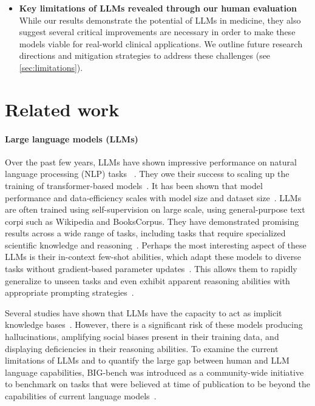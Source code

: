 \begin{itemize}[leftmargin=1.5em,rightmargin=0em]
\item \textbf{Key limitations of LLMs revealed through our human evaluation} While our results demonstrate the potential of LLMs in medicine, they also suggest several critical improvements are necessary in order to make these models viable for real-world clinical applications. We outline future research directions and mitigation strategies to address these challenges (see \ref{sec:limitations}).

\end{itemize}

\section{Related work}
\label{sec:related_work}
\paragraph{Large language models (LLMs)} Over the past few years, LLMs have shown impressive performance on natural language processing (NLP) tasks ~\cite{brown2020language, chowdhery2022palm, chung2022scaling, hoffmann2022training, scao2022bloom, rae2021scaling, raffel2020exploring, wei2021finetuned, wei2022chain, zhang2022opt}. They owe their success to scaling up the training of transformer-based models~\cite{vaswani2017attention}. It has been shown that model performance and data-efficiency scales with model size and dataset size~\cite{kaplan2020scaling}. LLMs are often trained using self-supervision on large scale, using general-purpose text corpi such as Wikipedia and BooksCorpus. They have demonstrated promising results across a wide range of tasks, including tasks that require specialized scientific knowledge and reasoning~\cite{hendrycks2020measuring, cobbe2021training}. Perhaps the most interesting aspect of these LLMs is their in-context few-shot abilities, which adapt these models to diverse tasks without gradient-based parameter updates~\cite{brown2020language, lampinen2022can, kojima2022large, wei2021finetuned}. This allows them to rapidly generalize to unseen tasks and even exhibit apparent reasoning abilities with appropriate prompting strategies~\cite{chowdhery2022palm, lewkowycz2022solving, taylor2022galactica, wei2022chain}.  

Several studies have shown that LLMs have the capacity to act as implicit knowledge bases~\cite{joshi2017triviaqa, hendrycks2020measuring, taylor2022galactica}. However, there is a significant risk of these models producing hallucinations, amplifying social biases present in their training data, and displaying deficiencies in their reasoning abilities. To examine the current limitations of LLMs and to quantify the large gap between human and LLM language capabilities, BIG-bench was introduced as a community-wide initiative to benchmark on tasks that were believed at time of publication to be beyond the capabilities of current language models~\cite{srivastava2022beyond}. 

